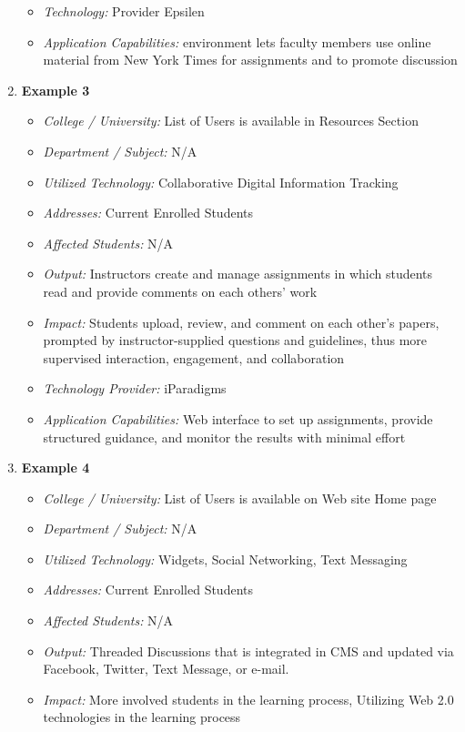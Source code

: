 \documentclass[12pt,a4paper,final,twoside,onecolumn,titlepage]{book}
\begin{document}
\begin{enumerate}
\begin{itemize}
\item \textit{Technology:} Provider	Epsilen
\item \textit{Application Capabilities:} environment lets faculty members use online material from New York Times for assignments and to promote discussion
\end{itemize} 
\item \textbf{Example 3}
\begin{itemize}
\item \textit{College / University:} List of Users is available in Resources Section
\item \textit{Department / Subject:} N/A
\item \textit{Utilized Technology:} Collaborative Digital Information Tracking
\item \textit{Addresses:} Current Enrolled Students
\item \textit{Affected Students:} N/A
\item \textit{Output:} Instructors create and manage assignments in which students read and provide comments on each others' work
\item \textit{Impact:} Students upload, review, and comment on each other's papers, prompted by instructor-supplied questions and guidelines, thus more supervised interaction, engagement, and collaboration
\item \textit{Technology Provider:} iParadigms
\item \textit{Application Capabilities:} Web interface to set up assignments, provide structured guidance, and monitor the results with minimal effort
\end{itemize}
\item \textbf{Example 4}
\begin{itemize}
\item \textit{College / University:} List of Users is available on Web site Home page
\item \textit{Department / Subject:} N/A
\item \textit{Utilized Technology:} Widgets, Social Networking, Text Messaging
\item \textit{Addresses:} Current Enrolled Students
\item \textit{Affected Students:} N/A
\item \textit{Output:} Threaded Discussions that is integrated in \gls{CMS} and updated via Facebook, Twitter, Text Message, or e-mail.
\item \textit{Impact:} More involved students in the learning process, Utilizing Web 2.0 technologies in the learning process

\end{itemize}
\end{enumerate}
\end{document}

